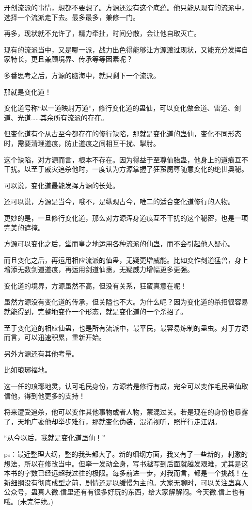 \begin{this_body}
开创流派的事情，想都不要想了。方源还没有这个底蕴。他只能从现有的流派中，选择一个流派走下去。最多最多，兼修一门。

再多，现状就不允许了，精力牵扯，时间分散，会让他自取灭亡。

现有的流派当中，又是哪一派，战力出色得能够让方源渡过现状，又能充分发挥自家特长，更且兼顾境界、传承等等因素呢？

多番思考之后，方源的脑海中，就只剩下一个流派。

那就是变化道！

变化道号称“以一道映射万道”，修行变化道的蛊仙，可以变化做金道、雷道、剑道、光道……其余所有流派的存在。

但变化道有个从古至今都存在的修行缺陷，那就是变化道的蛊仙，变化不同形态时，需要清理道痕，防止道痕之间相互干扰、掣肘。

这个缺陷，对方源而言，根本不存在。因为得益于至尊仙胎蛊，他身上的道痕互不干扰。以至于戚灾追杀他时，一度认为方源掌握了狂蛮魔尊随意变化的绝世奥秘。

可以说，变化道最能发挥方源的长处。

还可以说，方源是当今，哦不，是纵观古今，唯二的适合变化道修行的人物。

更妙的是，一旦修行变化道，那么对方源浑身道痕互不干扰的这个秘密，也是一项完美的遮掩。

方源可以变化之后，堂而皇之地运用各种流派的仙蛊，而不会引起他人疑心。

而且变化之后，再运用相应流派的仙蛊，无疑更增威能。比如变作剑道猛兽，身上增添无数剑道道痕，再运用剑道仙蛊，无疑威力增幅更多更强。

变化道的境界，方源虽然不高，但没有关系，狂蛮真意在呢！

虽然方源没有变化道的传承，但关隘也不大。为什么呢？因为变化道的杀招很容易就能得到，完整地变作一个形态，就是变化道的一个杀招了。

至于变化道的相应仙蛊，也是所有流派中，最平民，最容易炼制的蛊虫。对于方源而言，可以迅速积累，重新开始。

另外方源还有其他考量。

比如琅琊福地。

这一任的琅琊地灵，认可毛民身份，方源若是修行有成，完全可以变作毛民蛊仙取信他，得到他更多的支持！

将来遭受追杀，他可以变作其他事物或者人物，蒙混过关。若是现在的身份也暴露了，天地广袤他却举步难行，那就变化伪装，混淆视听，照样行走江湖。

“从今以后，我就是变化道蛊仙！”

ps：最近整理大纲，整的我头都大了。新的细纲方面，我又有了一些新的，刺激的想法，所以在修改当中。但牵一发动全身，写书越写到后面就越发艰难，尤其是这本书的字数已经远超我过往的极限。每多前进一步，对我而言，都是一个挑战！在新细纲没有彻底成型之前，剧情还是以缓慢为主的。大家无聊时，可以关注蛊真人公众号，蛊真人微.信里还有有很多好玩的东西，给大家解解闷。今天微.信上也有哦。(未完待续。)

\end{this_body}

